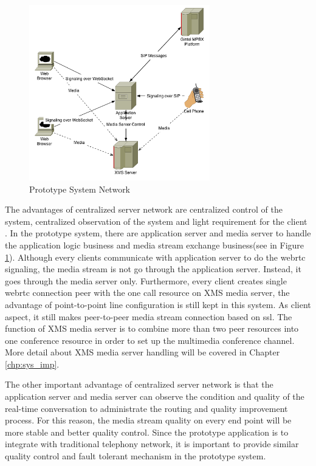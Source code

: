 \begin{figure}
	\centering
    	\includegraphics[width=0.70\textwidth,natwidth=610,natheight=642]{figs/system_network.png}
  	\caption{Prototype System Network}
  	\label{fig:system_network}
\end{figure}

\par The advantages of centralized server network are centralized control of the system, centralized observation of the system and light requirement for the client . In the prototype system, there are application server and media server to handle the application logic business and media stream exchange business(see in Figure \ref{fig:system_network}). Although every clients communicate with application server to do the \gls{webrtc} signaling, the media stream is not go through the application server. Instead, it goes through the media server only. Furthermore, every client creates single \gls{webrtc} connection peer with the one call resource on XMS media server, the advantage of point-to-point line configuration is still kept in this system. As client aspect, it still makes peer-to-peer media stream connection based on \gls{ssl}. The function of XMS media server is to combine more than two peer resources into one conference resource in order to set up the multimedia conference channel. More detail about XMS media server handling will be covered in Chapter \ref{chp:sys_imp}.

\par The other important advantage of centralized server network is that the application server and media server can observe the condition and quality of the real-time conversation to administrate the routing and quality improvement process. For this reason, the media stream quality on every end point will be more stable and better quality control. Since the prototype application is to integrate with traditional telephony network, it is important to provide similar quality control and fault tolerant mechanism in the prototype system.

